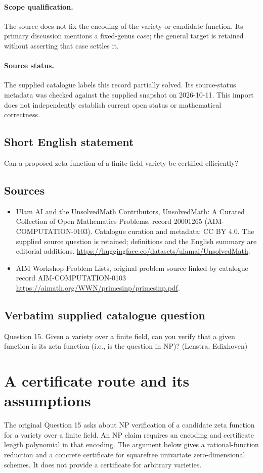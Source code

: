 \documentclass[11pt]{article}
\begin{document}
\paragraph{Scope qualification.}
The source does not fix the encoding of the variety or candidate function. Its primary discussion mentions a fixed-genus case; the general target is retained without asserting that case settles it.
\paragraph{Source status.}
The supplied catalogue labels this record partially solved. Its source-status metadata was checked against the supplied snapshot on 2026-10-11. This import does not independently establish current open status or mathematical correctness.
\subsection{Short English statement}
Can a proposed zeta function of a finite-field variety be certified efficiently?
\subsection{Sources}
\begin{itemize}
\item[S1] Ulam AI and the UnsolvedMath Contributors, UnsolvedMath: A Curated Collection of Open Mathematics Problems, record 20001265 (AIM-COMPUTATION-0103). Catalogue curation and metadata: CC BY 4.0. The supplied source question is retained; definitions and the English summary are editorial additions.
\url{https://huggingface.co/datasets/ulamai/UnsolvedMath}.
\item[S2] AIM Workshop Problem Lists, original problem source linked by catalogue record AIM-COMPUTATION-0103
\url{https://aimath.org/WWN/primesinp/primesinp.pdf}.
\end{itemize}
\subsection{Verbatim supplied catalogue question}
Question 15. Given a variety over a finite field, can you verify that a given function is its zeta function (i.e., is the question in NP)? (Lenstra, Edixhoven)

\section{A certificate route and its assumptions}
The original Question 15 asks about NP verification of a candidate
zeta function for a variety over a finite field. An NP claim requires
an encoding and certificate length polynomial in that encoding. The
argument below gives a rational-function reduction and a concrete
certificate for squarefree univariate zero-dimensional schemes. It
does not provide a certificate for arbitrary varieties.
\end{document}
